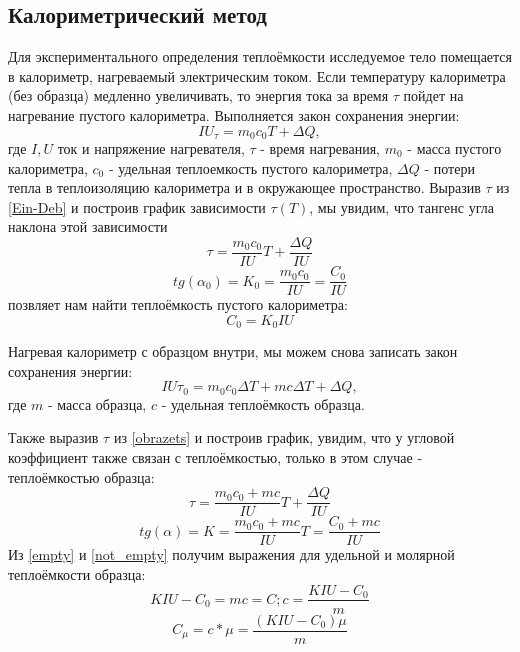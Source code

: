 \documentclass[a4paper,12pt]{article}
\begin{document}
\subsection{Калориметрический метод}
\vspace{\parindent} Для экспериментального определения теплоёмкости исследуемое тело помещается в калориметр, нагреваемый электрическим током. Если температуру калориметра (без образца) медленно увеличивать, то энергия тока за время $\tau$ пойдет на нагревание пустого калориметра. Выполняется закон сохранения энергии:
\begin{equation}\label{Ein-Deb}
IU_\tau = m_0c_0T + \Delta Q,
\end{equation}
где $I, U$ ток и напряжение нагревателя, $\tau$ - время нагревания, $m_0$ - масса пустого калориметра, $c_0$ - удельная теплоемкость пустого калориметра, $\Delta Q$ - потери тепла в теплоизоляцию калориметра и в окружающее пространство.
Выразив $\tau$ из \eqref{Ein-Deb} и построив график зависимости $\tau(T)$, мы увидим, что тангенс угла наклона этой зависимости
$$\tau = \frac{m_0c_0}{IU}T + \frac{\Delta Q}{IU}$$
\begin{equation}\label{empty}
tg(\alpha_0) = K_0 = \frac{m_0c_0}{IU} = \frac{C_0}{IU}
\end{equation}
позвляет нам найти теплоёмкость пустого калориметра: 
$$C_0 = K_0IU$$

Нагревая калориметр с образцом внутри, мы можем снова записать закон сохранения энергии:
\begin{equation}\label{obrazets}
IU\tau_0 = m_0c_0\Delta T + mc\Delta T + \Delta Q,
\end{equation}
где $m$ - масса образца, $c$ - удельная теплоёмкость образца.

Также выразив $\tau$ из \eqref{obrazets} и построив график, увидим, что у угловой коэффициент также связан с теплоёмкостью, только в этом случае - теплоёмкостью образца:
$$\tau = \frac{m_0c_0 + mc}{IU}T + \frac{\Delta Q}{IU}$$
\begin{equation}\label{not_empty}
tg(\alpha) = K = \frac{m_0c_0 + mc}{IU}T  = \frac{C_0+mc}{IU}
\end{equation}
Из \eqref{empty} и \eqref{not_empty} получим выражения для удельной и молярной теплоёмкости образца:
\begin{equation}
KIU - C_0 = mc = C; c = \frac{KIU - C_0}{m}
\end{equation}
\begin{equation}
C_\mu = c*\mu = \frac{(KIU - C_0)\mu}{m}
\end{equation}
\end{document}
